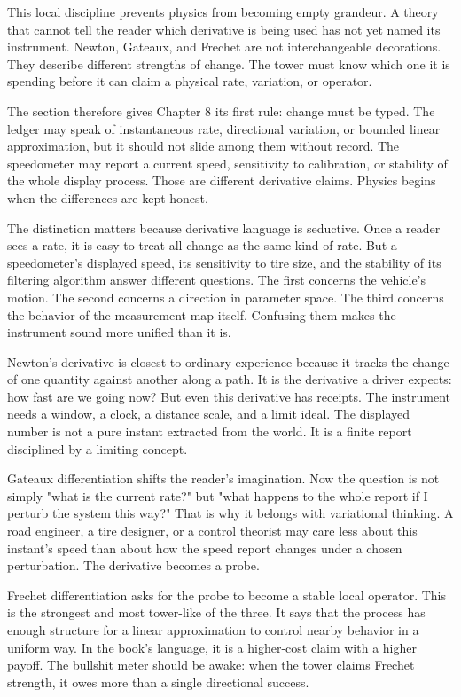 This local discipline prevents physics from becoming empty grandeur. A theory
that cannot tell the reader which derivative is being used has not yet named
its instrument. Newton, Gateaux, and Frechet are not interchangeable
decorations. They describe different strengths of change. The tower must know
which one it is spending before it can claim a physical rate, variation, or
operator.

The section therefore gives Chapter 8 its first rule: change must be typed. The
ledger may speak of instantaneous rate, directional variation, or bounded
linear approximation, but it should not slide among them without record. The
speedometer may report a current speed, sensitivity to calibration, or stability
of the whole display process. Those are different derivative claims. Physics
begins when the differences are kept honest.

The distinction matters because derivative language is seductive. Once a reader
sees a rate, it is easy to treat all change as the same kind of rate. But a
speedometer's displayed speed, its sensitivity to tire size, and the stability
of its filtering algorithm answer different questions. The first concerns the
vehicle's motion. The second concerns a direction in parameter space. The third
concerns the behavior of the measurement map itself. Confusing them makes the
instrument sound more unified than it is.

Newton's derivative is closest to ordinary experience because it tracks the
change of one quantity against another along a path. It is the derivative a
driver expects: how fast are we going now? But even this derivative has
receipts. The instrument needs a window, a clock, a distance scale, and a limit
ideal. The displayed number is not a pure instant extracted from the world. It
is a finite report disciplined by a limiting concept.

Gateaux differentiation shifts the reader's imagination. Now the question is
not simply "what is the current rate?" but "what happens to the whole report if
I perturb the system this way?" That is why it belongs with variational
thinking. A road engineer, a tire designer, or a control theorist may care less
about this instant's speed than about how the speed report changes under a
chosen perturbation. The derivative becomes a probe.

Frechet differentiation asks for the probe to become a stable local operator.
This is the strongest and most tower-like of the three. It says that the
process has enough structure for a linear approximation to control nearby
behavior in a uniform way. In the book's language, it is a higher-cost claim
with a higher payoff. The bullshit meter should be awake: when the tower claims
Frechet strength, it owes more than a single directional success.

